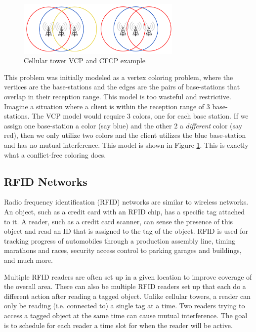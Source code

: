 \documentclass{sig-alternate}
\begin{document}
\begin{figure}[h]
	\centering
	\includegraphics[width=8cm,trim=4 4 4 4,clip]{../figures/towers.pdf}
	\caption{Cellular tower VCP and CFCP example}\label{fig:towers}
\end{figure}

This problem was initially modeled as a vertex coloring problem, where the vertices are the base-stations and the edges are the pairs of base-stations that overlap in their reception range. This model is too wasteful and restrictive. Imagine a situation where a client is within the reception range of 3 base-stations. The VCP model would require 3 colors, one for each base station. If we assign one base-station a color (say blue) and the other 2 a \emph{different} color (say red), then we only utilize two colors and the client utilizes the blue base-station and has no mutual interference. This model is shown in Figure \ref{fig:towers}. This is exactly what a conflict-free coloring does. \cite{smorodinsky2013conflict}

\subsection{RFID Networks}
Radio frequency identification (RFID) networks are similar to wireless networks. An object, such as a credit card with an RFID chip, has a specific tag attached to it. A reader, such as a credit card scanner, can sense the presence of this object and read an ID that is assigned to the tag of the object. RFID is used for tracking progress of automobiles through a production assembly line, timing marathons and races, security access control to parking garages and buildings, and much more.

Multiple RFID readers are often set up in a given location to improve coverage of the overall area. There can also be multiple RFID readers set up that each do a different action after reading a tagged object. Unlike cellular towers, a reader can only be reading (i.e. connected to) a single tag at a time. Two readers trying to access a tagged object at the same time can cause mutual interference. The goal is to schedule for each reader a time slot for when the reader will be active.
\end{document}
